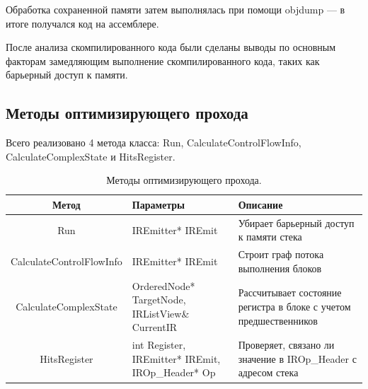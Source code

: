 Обработка сохраненной памяти затем выполнялась при помощи objdump \cite{objdump} --- в итоге получался код на ассемблере.

После анализа скомпилированного кода были сделаны выводы по основным факторам замедляющим выполнение скомпилированного кода, таких как барьерный доступ к памяти.

\subsection{Методы оптимизирующего прохода}

Всего реализовано 4 метода класса: Run, CalculateControlFlowInfo, \\ CalculateComplexState и HitsRegister.

\begin{table}[!htb]
	\label{table:benches}
	\begin{center}
		\caption{Методы оптимизирующего прохода.}
		\begin{tabular}{|c|p{4.5cm}|p{5.5cm}|}
			\hline
			\bfseries Метод & \bfseries Параметры & \bfseries Описание \\
			\hline
			Run & IREmitter* IREmit & Убирает барьерный доступ к памяти стека \\ \hline
			CalculateControlFlowInfo & IREmitter* IREmit & Строит граф потока выполнения блоков \\ \hline
			CalculateComplexState & OrderedNode* TargetNode,
			IRListView\& CurrentIR & Рассчитывает состояние регистра в блоке с учетом предшественников \\ \hline
			HitsRegister & int Register, IREmitter* IREmit,
			IROp\_Header* Op & Проверяет, связано ли значение в IROp\_Header с адресом стека \\ \hline
		\end{tabular}
	\end{center}
\end{table}


